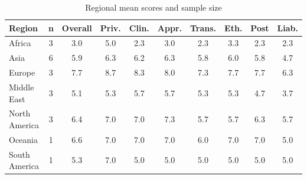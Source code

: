 \begin{table}[htbp]
\centering
\caption[Regional mean scores]{Regional mean scores and sample size}
\label{tab:regional-means}
\footnotesize
\setlength{\tabcolsep}{3.5pt}
\begin{tabular}{@{}l c c c c c c c c c@{}}
\toprule
\textbf{Region} & \textbf{n} & \textbf{Overall} & \textbf{Priv.} & \textbf{Clin.} & \textbf{Appr.} & \textbf{Trans.} & \textbf{Eth.} & \textbf{Post} & \textbf{Liab.} \\
\midrule
Africa & 3 & 3.0 & 5.0 & 2.3 & 3.0 & 2.3 & 3.3 & 2.3 & 2.3 \\
Asia & 6 & 5.9 & 6.3 & 6.2 & 6.3 & 5.8 & 6.0 & 5.8 & 4.7 \\
Europe & 3 & 7.7 & 8.7 & 8.3 & 8.0 & 7.3 & 7.7 & 7.7 & 6.3 \\
Middle East & 3 & 5.1 & 5.3 & 5.7 & 5.7 & 5.3 & 5.3 & 4.7 & 3.7 \\
North America & 3 & 6.4 & 7.0 & 7.0 & 7.3 & 5.7 & 5.7 & 6.3 & 5.7 \\
Oceania & 1 & 6.6 & 7.0 & 7.0 & 7.0 & 6.0 & 7.0 & 7.0 & 5.0 \\
South America & 1 & 5.3 & 7.0 & 5.0 & 5.0 & 5.0 & 5.0 & 5.0 & 5.0 \\
\bottomrule
\end{tabular}
\end{table}
